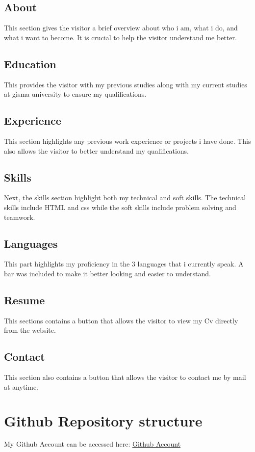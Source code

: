 \documentclass{article}
\begin{document}
\subsection{About}
This section gives the visitor a brief overview about who i am, what i do, and what i want to become. It is crucial to help the visitor understand me better.
\subsection{Education}
This provides the visitor with my previous studies along with my current studies at gisma university to ensure my qualifications.
\subsection{Experience}
This section highlights any previous work experience or projects i have done. This also allows the visitor to better understand my qualifications.
\subsection{Skills}
Next, the skills section highlight both my technical and soft skills. The technical skills include HTML and css while the soft skills include problem solving and teamwork.
\subsection{Languages}
This part highlights my proficiency in the 3 languages that i currently speak. A bar was included to make it better looking and easier to understand.
\subsection{Resume}
This sections contains a button that allows the visitor to view my Cv directly from the website.
\subsection{Contact}
This section also contains a button that allows the visitor to contact me by mail at anytime.
\section{Github Repository structure}
My Github Account can be accessed here:
\href{https://github.com/Eizeldeen-Marzouq}{Github Account}
\end{document}
